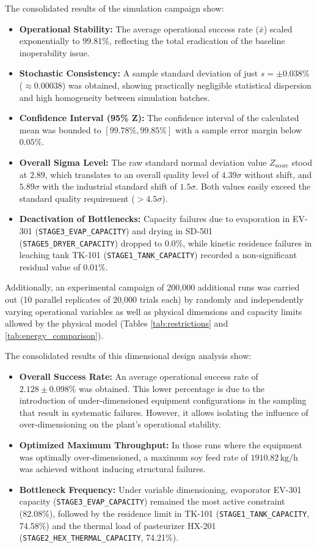 \documentclass[10pt,letterpaper,twocolumn]{article}
\begin{document}
The consolidated results of the simulation campaign show:
\begin{itemize}
    \item \textbf{Operational Stability:} The average operational success rate ($\bar{x}$) scaled exponentially to $99.81\%$, reflecting the total eradication of the baseline inoperability issue.
    \item \textbf{Stochastic Consistency:} A sample standard deviation of just $s = \pm 0.038\%$ ($\approx 0.00038$) was obtained, showing practically negligible statistical dispersion and high homogeneity between simulation batches.
    \item \textbf{Confidence Interval (95\% Z):} The confidence interval of the calculated mean was bounded to $[99.78\%, 99.85\%]$ with a sample error margin below $0.05\%$.
    \item \textbf{Overall Sigma Level:} The raw standard normal deviation value $Z_{\text{score}}$ stood at $2.89$, which translates to an overall quality level of $4.39\sigma$ without shift, and $5.89\sigma$ with the industrial standard shift of $1.5\sigma$. Both values easily exceed the standard quality requirement ($>4.5\sigma$).
    \item \textbf{Deactivation of Bottlenecks:} Capacity failures due to evaporation in EV-301 (\texttt{STAGE3\_EVAP\_CAPACITY}) and drying in SD-501 (\texttt{STAGE5\_DRYER\_CAPACITY}) dropped to $0.0\%$, while kinetic residence failures in leaching tank TK-101 (\texttt{STAGE1\_TANK\_CAPACITY}) recorded a non-significant residual value of $0.01\%$.
\end{itemize}

Additionally, an experimental campaign of 200,000 additional runs was carried out (10 parallel replicates of 20,000 trials each) by randomly and independently varying operational variables as well as physical dimensions and capacity limits allowed by the physical model (Tables \ref{tab:restrictions} and \ref{tab:energy_comparison}).

The consolidated results of this dimensional design analysis show:
\begin{itemize}
    \item \textbf{Overall Success Rate:} An average operational success rate of $2.128 \pm 0.098\%$ was obtained. This lower percentage is due to the introduction of under-dimensioned equipment configurations in the sampling that result in systematic failures. However, it allows isolating the influence of over-dimensioning on the plant's operational stability.
    \item \textbf{Optimized Maximum Throughput:} In those runs where the equipment was optimally over-dimensioned, a maximum soy feed rate of $1910.82\,\text{kg/h}$ was achieved without inducing structural failures.
    \item \textbf{Bottleneck Frequency:} Under variable dimensioning, evaporator EV-301 capacity (\texttt{STAGE3\_EVAP\_CAPACITY}) remained the most active constraint (82.08\%), followed by the residence limit in TK-101 (\texttt{STAGE1\_TANK\_CAPACITY}, 74.58\%) and the thermal load of pasteurizer HX-201 (\texttt{STAGE2\_HEX\_THERMAL\_CAPACITY}, 74.21\%).
\end{itemize}
\end{document}

